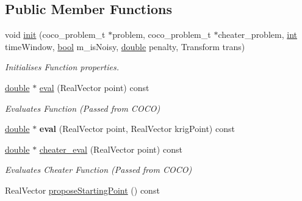 \subsection*{Public Member Functions}
\begin{DoxyCompactItemize}
\item 
void \hyperlink{classCOCOfunc_aef35b3b037b11a843bb77fd269f5447f}{init} (coco\+\_\+problem\+\_\+t $\ast$problem, coco\+\_\+problem\+\_\+t $\ast$cheater\+\_\+problem, \hyperlink{classint}{int} time\+Window, \hyperlink{classbool}{bool} m\+\_\+is\+Noisy, \hyperlink{classdouble}{double} penalty, Transform trans)
\begin{DoxyCompactList}\small\item\em Initialises Function properties. \end{DoxyCompactList}\item 
\hyperlink{classdouble}{double} $\ast$ \hyperlink{classCOCOfunc_af59cef4f0a78c07c4910bf015363c3f5}{eval} (Real\+Vector point) const 
\begin{DoxyCompactList}\small\item\em Evaluates Function (Passed from C\+O\+CO) \end{DoxyCompactList}\item 
\hyperlink{classdouble}{double} $\ast$ {\bfseries eval} (Real\+Vector point, Real\+Vector krig\+Point) const \hypertarget{classCOCOfunc_a5212e78af436dfe41259bf21217cb80b}{}\label{classCOCOfunc_a5212e78af436dfe41259bf21217cb80b}

\item 
\hyperlink{classdouble}{double} $\ast$ \hyperlink{classCOCOfunc_aaf37b734aed084757a8ccf5ad4d66705}{cheater\+\_\+eval} (Real\+Vector point) const 
\begin{DoxyCompactList}\small\item\em Evaluates Cheater Function (Passed from C\+O\+CO) \end{DoxyCompactList}\item 
Real\+Vector \hyperlink{classCOCOfunc_a2a5d8bccb6235159b8f28be24c989d07}{propose\+Starting\+Point} () const \hypertarget{classCOCOfunc_a2a5d8bccb6235159b8f28be24c989d07}{}\label{classCOCOfunc_a2a5d8bccb6235159b8f28be24c989d07}


\end{DoxyCompactItemize}
